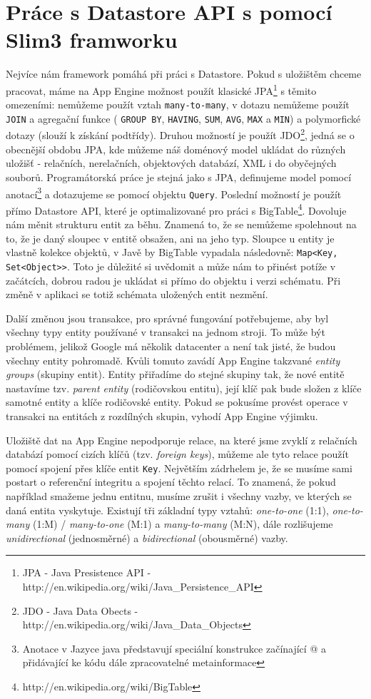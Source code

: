 \section{Práce s Datastore API s pomocí Slim3 framworku}
Nejvíce nám framework pomáhá při práci s Datastore. Pokud s uložištěm chceme pracovat, máme na App Engine možnost použít klasické JPA\footnote{JPA - Java Presistence API - http://en.wikipedia.org/wiki/Java\_Persistence\_API} s těmito omezeními: nemůžeme použít vztah \verb|many-to-many|, v dotazu nemůžeme použít \verb|JOIN| a agregační funkce ( \verb|GROUP BY|,  \verb|HAVING|,  \verb|SUM|,  \verb|AVG|,  \verb|MAX| a  \verb|MIN|) a polymorfické dotazy (slouží k získání podtřídy). Druhou možností je použít JDO\footnote{JDO - Java Data Obects - http://en.wikipedia.org/wiki/Java\_Data\_Objects}, jedná se o obecnější obdobu JPA, kde můžeme náš doménový model ukládat do různých uložišť - relačních, nerelačních, objektových databází,  XML i do obyčejných souborů. Programátorská práce je stejná jako s JPA, definujeme model pomocí anotací\footnote{Anotace v Jazyce java představují speciální konstrukce začínající @ a přidávající ke kódu dále zpracovatelné metainformace} a dotazujeme se pomocí objektu \verb|Query|. Poslední možností je použít přímo Datastore API, které je optimalizované pro práci s BigTable\footnote{http://en.wikipedia.org/wiki/BigTable}. Dovoluje nám měnit strukturu entit za běhu. Znamená to, že se nemůžeme spolehnout na to, že je daný sloupec v entitě obsažen, ani na jeho typ. Sloupce u entity je vlastně kolekce objektů, v Javě by BigTable vypadala následovně: \verb|Map<Key, Set<Object>>|. Toto je důležité si uvědomit a může nám to přinést potíže v začátcích, dobrou radou je ukládat si přímo do objektu i verzi schématu. Při změně v aplikaci se totiž schémata uložených entit nezmění. 

Další změnou jsou transakce, pro správné fungování potřebujeme, aby byl všechny typy entity používané v transakci na jednom stroji. To může být problémem, jelikož Google má několik datacenter a není tak jisté, že budou všechny entity pohromadě. Kvůli tomuto zavádí App Engine takzvané \emph{entity groups} (skupiny entit). Entity přiřadíme do stejné skupiny tak, že nové entitě nastavíme tzv. \emph{parent entity} (rodičovskou entitu), její klíč pak bude složen z klíče samotné entity a klíče rodičovské entity. Pokud se pokusíme provést operace v transakci na entitách z rozdílných skupin, vyhodí App Engine výjimku.

Uložiště dat na App Engine nepodporuje relace, na které jsme zvyklí z relačních databází pomocí cizích klíčů (tzv. \emph{foreign keys}), můžeme ale tyto relace použít pomocí spojení přes klíče entit \verb|Key|. Největším zádrhelem je, že se musíme sami postart o referenční integritu a spojení těchto relací. To znamená, že pokud například smažeme jednu entitnu, musíme zrušit i všechny vazby, ve kterých se daná entita vyskytuje. Existují tři základní typy vztahů: \emph{one-to-one} (1:1), \emph{one-to-many} (1:M) / \emph{many-to-one} (M:1) a \emph{many-to-many} (M:N), dále rozlišujeme \emph{unidirectional} (jednosměrné) a \emph{bidirectional} (obousměrné) vazby. 

